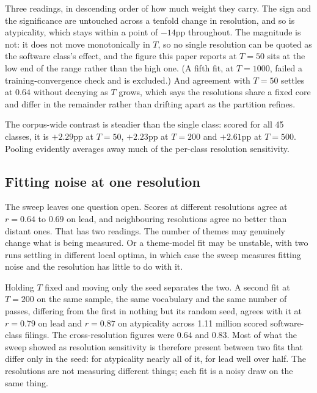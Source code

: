 \noindent Three readings, in descending order of how much weight they carry.
The sign and the significance are untouched across a tenfold change in
resolution, and so is atypicality, which stays within a point of $-14$pp
throughout. The magnitude is not: it does not move monotonically in $T$, so
no single resolution can be quoted as the software class's effect, and the
figure this paper reports at
$T = 50$ sits at the low end of the range rather than the high one. (A
fifth fit, at $T = 1000$, failed a training-convergence check and is
excluded.) And
agreement with $T = 50$ settles at $0.64$ without decaying as $T$ grows, which
says the resolutions share a fixed core and differ in the remainder rather than
drifting apart as the partition refines.

The corpus-wide contrast is steadier than the single class: scored for all
45 classes, it is $+2.29$pp at $T = 50$, $+2.23$pp at $T = 200$ and
$+2.61$pp at $T = 500$. Pooling evidently averages away much of the
per-class resolution sensitivity.

\subsection{Fitting noise at one resolution}

The sweep leaves one question open. Scores at different resolutions agree at
$r = 0.64$ to $0.69$ on lead, and neighbouring resolutions agree no better than
distant ones. That has two readings. The number of themes may genuinely change
what is being measured. Or a theme-model fit may be unstable, with two runs settling in different
local optima, in which case the sweep measures
fitting noise and the resolution has little to do with it.

Holding $T$ fixed and moving only the seed separates the two. A second fit at
$T = 200$ on the same sample, the same vocabulary and the same number of
passes, differing from the first in nothing but its random seed, agrees with
it at $r = 0.79$ on lead and $r = 0.87$ on atypicality across 1.11 million
scored software-class filings. The cross-resolution figures were $0.64$ and
$0.83$. Most of what the sweep showed as resolution sensitivity is therefore
present between two fits that differ only in the seed: for atypicality nearly
all of it, for lead well over half. The resolutions are not measuring
different things; each fit is a noisy draw on the same thing.

